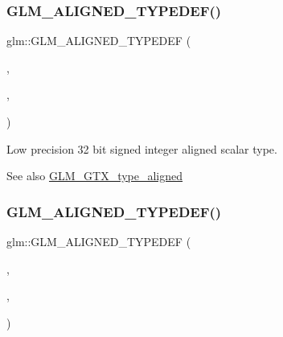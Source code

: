 \subsubsection{\texorpdfstring{G\+L\+M\+\_\+\+A\+L\+I\+G\+N\+E\+D\+\_\+\+T\+Y\+P\+E\+D\+E\+F()}{GLM\_ALIGNED\_TYPEDEF()}\hspace{0.1cm}{\footnotesize\ttfamily [7/209]}}
{\footnotesize\ttfamily glm\+::\+G\+L\+M\+\_\+\+A\+L\+I\+G\+N\+E\+D\+\_\+\+T\+Y\+P\+E\+D\+EF (\begin{DoxyParamCaption}\item[{\hyperlink{group__gtc__type__precision_gad9567c806dc39f534174eef42663119d}{lowp\+\_\+int32\+\_\+t}}]{,  }\item[{aligned\+\_\+lowp\+\_\+int32\+\_\+t}]{,  }\item[{4}]{ }\end{DoxyParamCaption})}

Low precision 32 bit signed integer aligned scalar type. \begin{DoxySeeAlso}{See also}
\hyperlink{group__gtx__type__aligned}{G\+L\+M\+\_\+\+G\+T\+X\+\_\+type\+\_\+aligned} 
\end{DoxySeeAlso}
\mbox{\label{group__gtx__type__aligned_ga7ccb60f3215d293fd62b33b31ed0e7be}} 
\subsubsection{\texorpdfstring{G\+L\+M\+\_\+\+A\+L\+I\+G\+N\+E\+D\+\_\+\+T\+Y\+P\+E\+D\+E\+F()}{GLM\_ALIGNED\_TYPEDEF()}\hspace{0.1cm}{\footnotesize\ttfamily [8/209]}}
{\footnotesize\ttfamily glm\+::\+G\+L\+M\+\_\+\+A\+L\+I\+G\+N\+E\+D\+\_\+\+T\+Y\+P\+E\+D\+EF (\begin{DoxyParamCaption}\item[{\hyperlink{group__gtc__type__precision_ga14d72e76d57c7f28eca8e933816c9fd6}{lowp\+\_\+int64\+\_\+t}}]{,  }\item[{aligned\+\_\+lowp\+\_\+int64\+\_\+t}]{,  }\item[{8}]{ }\end{DoxyParamCaption})}

